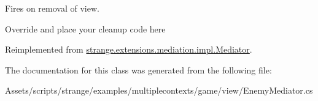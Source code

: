 Fires on removal of view. 

Override and place your cleanup code here 

Reimplemented from \hyperlink{classstrange_1_1extensions_1_1mediation_1_1impl_1_1_mediator_a9c65534ae8c37db9f4db7c84a94cd635}{strange.\-extensions.\-mediation.\-impl.\-Mediator}.



The documentation for this class was generated from the following file\-:\begin{DoxyCompactItemize}
\item 
Assets/scripts/strange/examples/multiplecontexts/game/view/Enemy\-Mediator.\-cs\end{DoxyCompactItemize}
